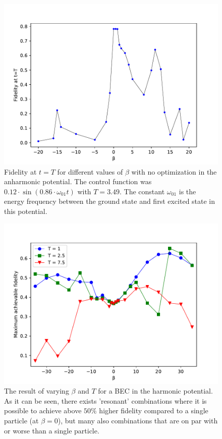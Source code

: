 \documentclass[aps,pra,reprint,superscriptaddress]{revtex4-1}
\begin{document}
\begin{figure}[h]
	\includegraphics[width=\columnwidth]{graphics/beta.pdf}
	\caption{Fidelity at $t=T$ for different values of $\beta$ with no optimization in the anharmonic potential. The control function was $0.12\cdot\sin(0.86\cdot \omega_{01} t)$ with $T = 3.49$. The constant $\omega_{01}$ is the energy frequency between the ground state and first excited state in this potential.}
	\label{fig:beta}
\end{figure}

\begin{figure}[h]
	\includegraphics[width=\columnwidth]{graphics/betaTHO.pdf}
	\caption{The result of varying $\beta$ and $T$ for a BEC in the harmonic potential. As it can be seen, there exists 'resonant' combinations where it is possible to achieve above $50\%$ higher fidelity compared to a single particle (at $\beta=0$), but many also combinations that are on par with or worse than a single particle.}
	\label{fig:HO}
\end{figure}
\end{document}
